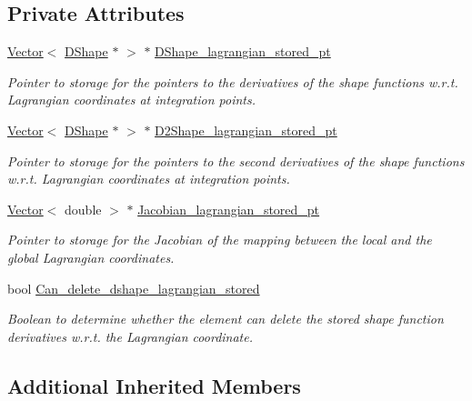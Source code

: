 \subsection*{Private Attributes}
\begin{DoxyCompactItemize}
\item 
\hyperlink{classoomph_1_1Vector}{Vector}$<$ \hyperlink{classoomph_1_1DShape}{D\+Shape} $\ast$ $>$ $\ast$ \hyperlink{classoomph_1_1StorableShapeSolidElementBase_aea43da502d9ec0f38f5018a9f73039af}{D\+Shape\+\_\+lagrangian\+\_\+stored\+\_\+pt}
\begin{DoxyCompactList}\small\item\em Pointer to storage for the pointers to the derivatives of the shape functions w.\+r.\+t. Lagrangian coordinates at integration points. \end{DoxyCompactList}\item 
\hyperlink{classoomph_1_1Vector}{Vector}$<$ \hyperlink{classoomph_1_1DShape}{D\+Shape} $\ast$ $>$ $\ast$ \hyperlink{classoomph_1_1StorableShapeSolidElementBase_a5b70ba5dbc22fa3d5741b1cf0791f84b}{D2\+Shape\+\_\+lagrangian\+\_\+stored\+\_\+pt}
\begin{DoxyCompactList}\small\item\em Pointer to storage for the pointers to the second derivatives of the shape functions w.\+r.\+t. Lagrangian coordinates at integration points. \end{DoxyCompactList}\item 
\hyperlink{classoomph_1_1Vector}{Vector}$<$ double $>$ $\ast$ \hyperlink{classoomph_1_1StorableShapeSolidElementBase_a0817df47c8e2d67c75407a03744504e8}{Jacobian\+\_\+lagrangian\+\_\+stored\+\_\+pt}
\begin{DoxyCompactList}\small\item\em Pointer to storage for the Jacobian of the mapping between the local and the global Lagrangian coordinates. \end{DoxyCompactList}\item 
bool \hyperlink{classoomph_1_1StorableShapeSolidElementBase_acacb2dca4af0a7f55c63ddc8a4d952f8}{Can\+\_\+delete\+\_\+dshape\+\_\+lagrangian\+\_\+stored}
\begin{DoxyCompactList}\small\item\em Boolean to determine whether the element can delete the stored shape function derivatives w.\+r.\+t. the Lagrangian coordinate. \end{DoxyCompactList}\end{DoxyCompactItemize}
\subsection*{Additional Inherited Members}


